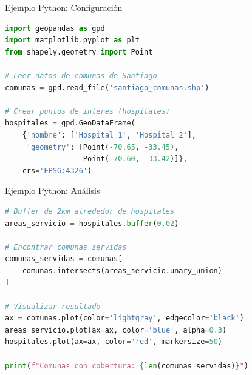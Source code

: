 \documentclass[10pt]{beamer}
\begin{document}
\begin{frame}[fragile]{Ejemplo Python: Configuración}
    \begin{lstlisting}[language=Python]
import geopandas as gpd
import matplotlib.pyplot as plt
from shapely.geometry import Point

# Leer datos de comunas de Santiago
comunas = gpd.read_file('santiago_comunas.shp')

# Crear puntos de interes (hospitales)
hospitales = gpd.GeoDataFrame(
    {'nombre': ['Hospital 1', 'Hospital 2'],
     'geometry': [Point(-70.65, -33.45), 
                  Point(-70.60, -33.42)]},
    crs='EPSG:4326')
    \end{lstlisting}
\end{frame}

\begin{frame}[fragile]{Ejemplo Python: Análisis}
    \begin{lstlisting}[language=Python]
# Buffer de 2km alrededor de hospitales
areas_servicio = hospitales.buffer(0.02)

# Encontrar comunas servidas
comunas_servidas = comunas[
    comunas.intersects(areas_servicio.unary_union)
]

# Visualizar resultado
ax = comunas.plot(color='lightgray', edgecolor='black')
areas_servicio.plot(ax=ax, color='blue', alpha=0.3)
hospitales.plot(ax=ax, color='red', markersize=50)

print(f"Comunas con cobertura: {len(comunas_servidas)}")
    \end{lstlisting}
\end{frame}
\end{document}
